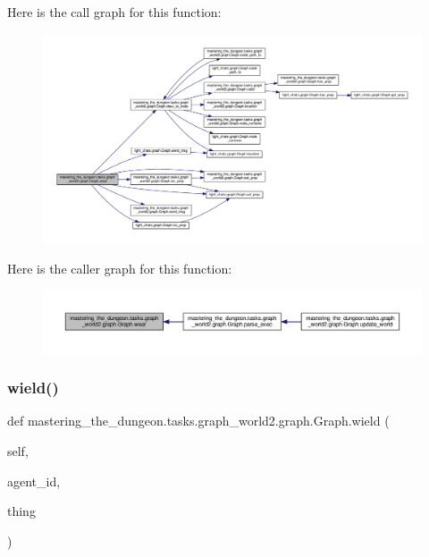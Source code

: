 Here is the call graph for this function\+:
\nopagebreak
\begin{figure}[H]
\begin{center}
\leavevmode
\includegraphics[width=350pt]{classmastering__the__dungeon_1_1tasks_1_1graph__world2_1_1graph_1_1Graph_a1a12d47f2f85ede7b8351ba138238bf2_cgraph}
\end{center}
\end{figure}
Here is the caller graph for this function\+:
\nopagebreak
\begin{figure}[H]
\begin{center}
\leavevmode
\includegraphics[width=350pt]{classmastering__the__dungeon_1_1tasks_1_1graph__world2_1_1graph_1_1Graph_a1a12d47f2f85ede7b8351ba138238bf2_icgraph}
\end{center}
\end{figure}
\mbox{\label{classmastering__the__dungeon_1_1tasks_1_1graph__world2_1_1graph_1_1Graph_a7e14bcd6bc0463bb02d81e13e19ae280}} 
\subsubsection{\texorpdfstring{wield()}{wield()}}
{\footnotesize\ttfamily def mastering\+\_\+the\+\_\+dungeon.\+tasks.\+graph\+\_\+world2.\+graph.\+Graph.\+wield (\begin{DoxyParamCaption}\item[{}]{self,  }\item[{}]{agent\+\_\+id,  }\item[{}]{thing }\end{DoxyParamCaption})}



